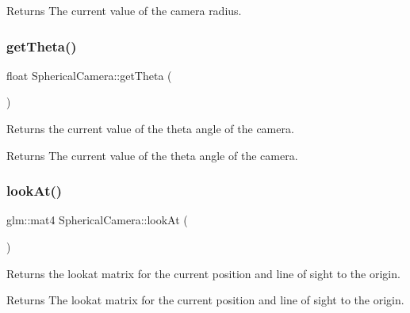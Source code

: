 \begin{DoxyReturn}{Returns}
The current value of the camera radius. 
\end{DoxyReturn}
\mbox{\label{class_spherical_camera_a1b6ec70441554aceae0bb10f10684a67}} 
\subsubsection{\texorpdfstring{get\+Theta()}{getTheta()}}
{\footnotesize\ttfamily float Spherical\+Camera\+::get\+Theta (\begin{DoxyParamCaption}{ }\end{DoxyParamCaption})}



Returns the current value of the theta angle of the camera. 

\begin{DoxyReturn}{Returns}
The current value of the theta angle of the camera. 
\end{DoxyReturn}
\mbox{\label{class_spherical_camera_a85c47420e596eb9675496f921f271c41}} 
\subsubsection{\texorpdfstring{look\+At()}{lookAt()}}
{\footnotesize\ttfamily glm\+::mat4 Spherical\+Camera\+::look\+At (\begin{DoxyParamCaption}{ }\end{DoxyParamCaption})}



Returns the lookat matrix for the current position and line of sight to the origin. 

\begin{DoxyReturn}{Returns}
The lookat matrix for the current position and line of sight to the origin. 
\end{DoxyReturn}
\mbox{\label{class_spherical_camera_ab9a3159731b05c8c4c4df0cef7cfee1a}} 
